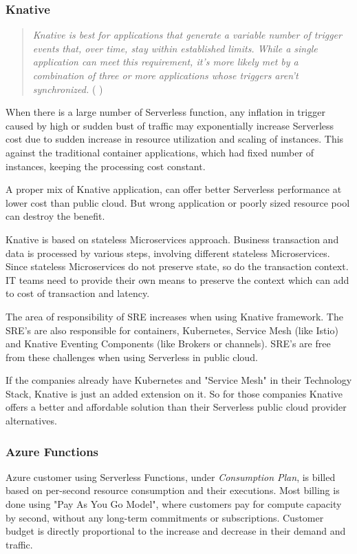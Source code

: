 \documentclass{article}
\begin{document}
\subsubsection{Knative}
\begin{quote}
    \textit{Knative is best for applications that generate a variable number of trigger events that, over time, stay within established limits. While a single application can meet this requirement, it's more likely met by a combination of three or more applications whose triggers aren't synchronized.}  ( \cite{Nolle_2020} )
\end{quote}
\par
\begin{flushleft}
When there is a large number of Serverless function, any inflation in trigger caused by high or sudden bust of traffic may exponentially increase Serverless cost due to sudden increase in resource utilization and scaling of instances. This against the traditional container applications, which had fixed number of instances, keeping the processing cost constant.
\par
A proper mix of Knative application, can offer better Serverless performance at lower cost than public cloud. But wrong application or poorly sized resource pool can destroy the benefit.
\par
Knative is based on stateless Microservices approach. Business transaction and data is processed by various steps, involving different stateless Microservices. Since stateless Microservices do not preserve state, so do the transaction context. IT teams need to provide their own means to preserve the context which can add to cost of transaction and latency.
\par
The area of responsibility of \gls{SRE} increases when using Knative framework. The \gls{SRE}'s are also responsible for containers, Kubernetes, Service Mesh (like Istio) and Knative Eventing Components (like  Brokers or channels). \gls{SRE}'s are free from these challenges when using Serverless in public cloud.
\par
If the companies already have Kubernetes and "Service Mesh" in their Technology Stack, Knative is just an added extension on it. So for those companies Knative offers a better and affordable solution than their Serverless public cloud provider alternatives.
\par
\subsubsection{Azure Functions}
Azure customer using Serverless Functions, under \textit{Consumption Plan}, is billed based on per-second resource consumption and their executions. Most billing is done using "Pay As You Go Model", where customers pay for compute capacity by second, without any long-term commitments or subscriptions. Customer budget is directly proportional to the increase and decrease in their demand and traffic.
\par
 

\end{flushleft}
\end{document}
